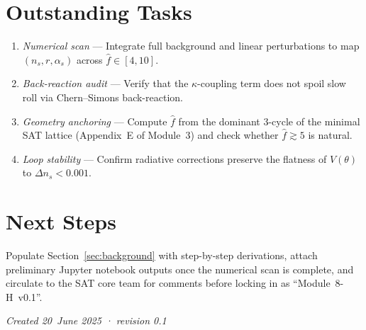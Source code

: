 \documentclass[12pt]{article}
\begin{document}
\section{Outstanding Tasks}
\begin{enumerate}
    \item \textit{Numerical scan} --- Integrate full background and linear perturbations to map $(n_s,r,\alpha_s)$ across $\hat f\in[4,10]$.
    \item \textit{Back-reaction audit} --- Verify that the $\kappa$-coupling term does not spoil slow roll via Chern--Simons back-reaction.
    \item \textit{Geometry anchoring} --- Compute $\hat f$ from the dominant 3-cycle of the minimal SAT lattice (Appendix~E of Module~3) and check whether $\hat f \gtrsim 5$ is natural.
    \item \textit{Loop stability} --- Confirm radiative corrections preserve the flatness of $V(\theta)$ to $\Delta n_s < 0.001$.
\end{enumerate}

\section{Next Steps}
Populate Section~\ref{sec:background} with step-by-step derivations, attach preliminary Jupyter notebook outputs once the numerical scan is complete, and circulate to the SAT core team for comments before locking in as ``Module~8-H~v0.1''.

\vfill
\noindent\textit{Created 20~June 2025 · revision 0.1}
\end{document}
